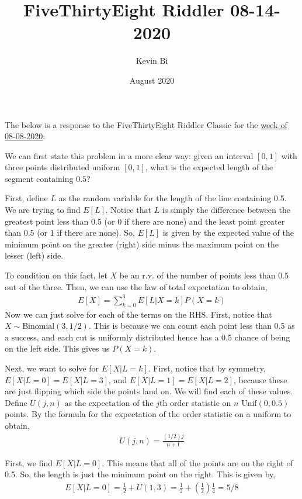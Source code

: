 \documentclass{article}
\title{FiveThirtyEight Riddler 08-14-2020}
\author{Kevin Bi}
\date{August 2020}
\newcommand{\Unif}{\text{Unif}}
\newcommand{\Bin}{\text{Binomial}}
\begin{document}
\maketitle
The below is a response to the FiveThirtyEight Riddler Classic for the \href{https://fivethirtyeight.com/features/are-you-hip-enough-to-be-square/}{week of 08-08-2020}:

We can first state this problem in a more clear way: given an interval $[0, 1]$ with three points distributed uniform $[0, 1]$, what is the expected length of the segment containing $0.5$?

First, define $L$ as the random variable for the length of the line containing 0.5. We are trying to find $E[L]$. Notice that $L$ is simply the difference between the greatest point less than 0.5 (or 0 if there are none) and the least point greater than 0.5 (or 1 if there are none). So, $E[L]$ is given by the expected value of the minimum point on the greater (right) side minus the maximum point on the lesser (left) side.

To condition on this fact, let $X$ be an r.v. of the number of points less than 0.5 out of the three. Then, we can use the law of total expectation to obtain,
\begin{align*}
    E[X] = \sum_{k = 0}^3 E[L | X = k]P(X = k)
\end{align*}
Now we can just solve for each of the terms on the RHS. First, notice that $X \sim \Bin(3, 1/2)$. This is because we can count each point less than 0.5 as a success, and each cut is uniformly distributed hence has a 0.5 chance of being on the left side. This gives us $P(X = k)$. 

Next, we want to solve for $E[X | L = k]$. First, notice that by symmetry, $E[X | L = 0] = E[X | L = 3]$, and $E[X | L = 1] = E[X | L = 2]$, because these are just flipping which side the points land on. We will find each of these values. Define $U(j, n)$ as the expectation of the $j$th order statistic on $n$ $\Unif(0, 0.5)$ points. By the formula for the expectation of the order statistic on a uniform to obtain,
\begin{align*}
    U(j, n) = \frac{(1/2) j}{n + 1}
\end{align*}

First, we find $E[X | L = 0]$. This means that all of the points are on the right of 0.5. So, the length is just the minimum point on the right. This is given by,
\begin{align*}
    E[X | L = 0] = \frac{1}{2} + U(1, 3) = \frac{1}{2} + \left(\frac{1}{2}\right) \frac{1}{4} = 5/8
\end{align*}
\end{document}
